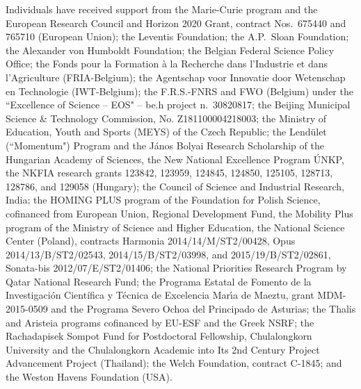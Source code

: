 \begin{acknowledgments}
 Individuals have received support from the Marie-Curie program and the European Research Council and Horizon 2020 Grant, contract Nos.\ 675440 and 765710 (European Union); the Leventis Foundation; the A.P.\ Sloan Foundation; the Alexander von Humboldt Foundation; the Belgian Federal Science Policy Office; the Fonds pour la Formation \`a la Recherche dans l'Industrie et dans l'Agriculture (FRIA-Belgium); the Agentschap voor Innovatie door Wetenschap en Technologie (IWT-Belgium); the F.R.S.-FNRS and FWO (Belgium) under the ``Excellence of Science -- EOS" -- be.h project n.\ 30820817; the Beijing Municipal Science \& Technology Commission, No. Z181100004218003; the Ministry of Education, Youth and Sports (MEYS) of the Czech Republic; the Lend\"ulet (``Momentum") Program and the J\'anos Bolyai Research Scholarship of the Hungarian Academy of Sciences, the New National Excellence Program \'UNKP, the NKFIA research grants 123842, 123959, 124845, 124850, 125105, 128713, 128786, and 129058 (Hungary); the Council of Science and Industrial Research, India; the HOMING PLUS program of the Foundation for Polish Science, cofinanced from European Union, Regional Development Fund, the Mobility Plus program of the Ministry of Science and Higher Education, the National Science Center (Poland), contracts Harmonia 2014/14/M/ST2/00428, Opus 2014/13/B/ST2/02543, 2014/15/B/ST2/03998, and 2015/19/B/ST2/02861, Sonata-bis 2012/07/E/ST2/01406; the National Priorities Research Program by Qatar National Research Fund; the Programa Estatal de Fomento de la Investigaci{\'o}n Cient{\'i}fica y T{\'e}cnica de Excelencia Mar\'{\i}a de Maeztu, grant MDM-2015-0509 and the Programa Severo Ochoa del Principado de Asturias; the Thalis and Aristeia programs cofinanced by EU-ESF and the Greek NSRF; the Rachadapisek Sompot Fund for Postdoctoral Fellowship, Chulalongkorn University and the Chulalongkorn Academic into Its 2nd Century Project Advancement Project (Thailand); the Welch Foundation, contract C-1845; and the Weston Havens Foundation (USA).
\end{acknowledgments}

